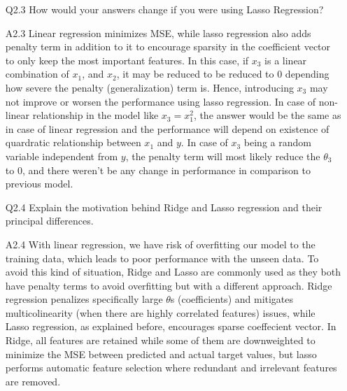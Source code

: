 \documentclass[11pt]{scrartcl}
\begin{document}
\begin{itemize}
\item[Q2.3] How would your answers change if you were using Lasso Regression?
\item[A2.3] Linear regression minimizes MSE, while lasso regression also adds penalty term in addition to it to encourage sparsity in the coefficient vector to only keep the most important features. In this case, if $x_3$ is a linear combination of $x_1$, and $x_2$, it may be reduced to be reduced to 0 depending how severe the penalty (generalization) term is. Hence, introducing $x_3$ may not improve or worsen the performance using lasso regression. In case of non-linear relationship in the model like ${x_3 = x_1 ^ 2}$, the answer would be the same as in case of linear regression and the performance will depend on existence of quardratic relationship between $x_1$ and $y$. In case of $x_3$ being a random variable independent from $y$, the penalty term will most likely reduce the $\theta_3$ to 0, and there weren't be any change in performance in comparison to previous model.  \\

\item[Q2.4] Explain the motivation behind Ridge and Lasso regression and their principal differences.
\item[A2.4] With linear regression, we have risk of overfitting our model to the training data, which leads to poor performance with the unseen data. To avoid this kind of situation, Ridge and Lasso are commonly used as they both have penalty terms to avoid overfitting but with a different approach. Ridge regression penalizes specifically large $\theta$s (coefficients) and mitigates multicolinearity (when there are highly correlated features) issues, while Lasso regression, as explained before, encourages sparse coeffecient vector. In Ridge, all features are retained while some of them are downweighted to minimize the MSE between predicted and actual target values, but lasso performs automatic feature selection where redundant and irrelevant features are removed.  \\  
\end{itemize}
\end{document}
